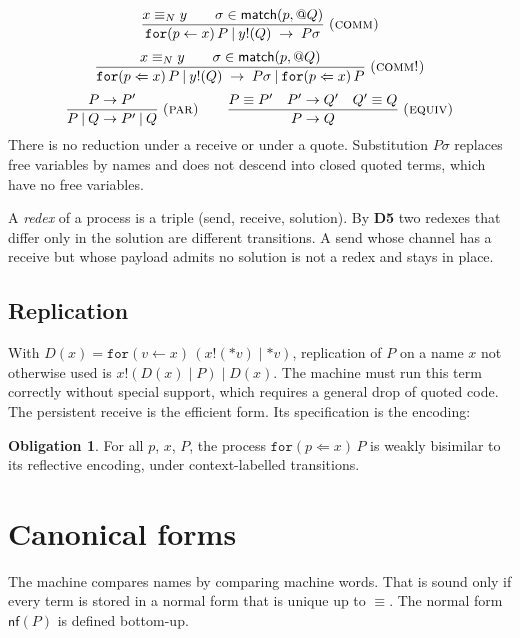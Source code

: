 \documentclass[10.5pt,a4paper]{extarticle}
\makeatletter
\newcommand{\kw}[1]{\texttt{#1}}
\newcommand{\quo}[1]{@#1}
\newcommand{\drp}[1]{{*}#1}
\newcommand{\for}[3]{\kw{for}(#1 \leftarrow #2)\,#3}
\newcommand{\forp}[3]{\kw{for}(#1 \Leftarrow #2)\,#3}
\newcommand{\snd}[2]{#1!(#2)}
\newcommand{\cpar}{\mathbin{|}}
\newcommand{\scong}{\equiv}
\newcommand{\nameq}{\equiv_N}
\newcommand{\red}{\rightarrow}
\newcommand{\nf}[1]{\mathsf{nf}(#1)}
\newcommand{\dec}[1]{\textbf{D#1}}
\theoremstyle{definition}
\newtheorem{obligation}{Obligation}
\theoremstyle{remark}
\makeatother
\begin{document}
\[
\frac{x \nameq y \qquad \sigma \in \mathsf{match}(p,\quo{Q})}
     {\for{p}{x}{P} \cpar \snd{y}{Q} \;\red\; P\sigma}\;\textsc{(comm)}
\]
\[
\frac{x \nameq y \qquad \sigma \in \mathsf{match}(p,\quo{Q})}
     {\forp{p}{x}{P} \cpar \snd{y}{Q} \;\red\; P\sigma \cpar \forp{p}{x}{P}}\;\textsc{(comm!)}
\]
\[
\frac{P \red P'}{P \cpar Q \red P' \cpar Q}\;\textsc{(par)}
\qquad
\frac{P \scong P' \quad P' \red Q' \quad Q' \scong Q}{P \red Q}\;\textsc{(equiv)}
\]
There is no reduction under a receive or under a quote. Substitution
$P\sigma$ replaces free variables by names and does not descend into closed
quoted terms, which have no free variables.

A \emph{redex} of a process is a triple (send, receive, solution). By \dec{5}
two redexes that differ only in the solution are different transitions. A
send whose channel has a receive but whose payload admits no solution is not
a redex and stays in place.

\subsection{Replication}

With $D(x) = \for{v}{x}{(\snd{x}{\drp{v}} \cpar \drp{v})}$, replication of
$P$ on a name $x$ not otherwise used is
$\snd{x}{D(x) \cpar P} \cpar D(x)$. The machine must run this term correctly
without special support, which requires a general drop of quoted code.
The persistent receive is the efficient form. Its specification is the
encoding:
\begin{obligation}\label{ob:repl}
For all $p$, $x$, $P$, the process $\forp{p}{x}{P}$ is weakly bisimilar to
its reflective encoding, under context-labelled transitions.
\end{obligation}

\section{Canonical forms}\label{sec:canon}

The machine compares names by comparing machine words. That is sound only if
every term is stored in a normal form that is unique up to $\scong$. The
normal form $\nf{P}$ is defined bottom-up.
\end{document}
